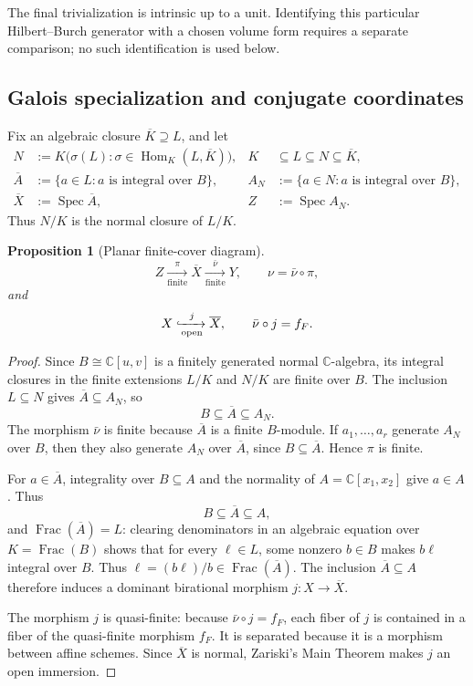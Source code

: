 \documentclass[11pt]{article}
\newtheorem{proposition}[theorem]{Proposition}
\theoremstyle{remark}
\theoremstyle{definition}
\DeclareMathOperator{\Spec}{Spec}
\DeclareMathOperator{\Frac}{Frac}
\DeclareMathOperator{\Hom}{Hom}
\newcommand{\C}{\mathbb C}
\begin{document}
The final trivialization is intrinsic up to a unit.  Identifying this
particular Hilbert--Burch generator with a chosen volume form requires a
separate comparison; no such identification is used below.

\subsection{Galois specialization and conjugate coordinates}

Fix an algebraic closure \(\overline K\supseteq L\), and let
\[
  \begin{aligned}
  N
    &:=
      K\bigl(\sigma(L):
        \sigma\in\Hom_K(L,\overline K)\bigr),
    &K&\subseteq L\subseteq N\subseteq\overline K,\\
  \overline A
    &:=
      \{a\in L:a\text{ is integral over }B\},
  &
  A_N
    &:=
      \{a\in N:a\text{ is integral over }B\},\\
  \overline X&:=\Spec\overline A,
  &
  Z&:=\Spec A_N.
  \end{aligned}
\]
Thus \(N/K\) is the normal closure of \(L/K\).

\begin{proposition}[Planar finite-cover diagram]
\label{prop:planar-normalization-diagram}
\[
  Z\xrightarrow[\mathrm{finite}]{\pi}
  \overline X\xrightarrow[\mathrm{finite}]{\bar\nu}Y,
  \qquad
  \nu=\bar\nu\circ\pi,
\]
and
\[
  X\xhookrightarrow[\mathrm{open}]{j}\overline X,
  \qquad
  \bar\nu\circ j=f_F.
\]
\end{proposition}

\begin{proof}
Since \(B\cong\C[u,v]\) is a finitely generated normal
\(\C\)-algebra, its integral closures in the finite extensions \(L/K\) and
\(N/K\) are finite over \(B\).  The inclusion \(L\subseteq N\) gives
\(\overline A\subseteq A_N\), so
\[
  B\subseteq\overline A\subseteq A_N.
\]
The morphism \(\bar\nu\) is finite because \(\overline A\) is a finite
\(B\)-module.  If \(a_1,\dots,a_r\) generate \(A_N\) over \(B\), then
they also generate \(A_N\) over \(\overline A\), since
\(B\subseteq\overline A\).  Hence \(\pi\) is finite.

For \(a\in\overline A\), integrality over \(B\subseteq A\) and the
normality of \(A=\C[x_1,x_2]\) give \(a\in A\).  Thus
  \[
  B\subseteq\overline A\subseteq A,
  \]
and \(\Frac(\overline A)=L\): clearing denominators in an algebraic
equation over \(K=\Frac(B)\) shows that for every \(\ell\in L\), some
nonzero \(b\in B\) makes \(b\ell\) integral over \(B\).  Thus
\(\ell=(b\ell)/b\in\Frac(\overline A)\).
The inclusion \(\overline A\subseteq A\) therefore induces a dominant
birational morphism \(j\colon X\to\overline X\).

The morphism \(j\) is quasi-finite: because
\(\bar\nu\circ j=f_F\), each fiber of \(j\) is contained in a fiber of
the quasi-finite morphism \(f_F\).  It is separated because it is a
morphism between affine schemes.  Since
\(\overline X\) is normal, Zariski's Main Theorem makes \(j\) an open
immersion.
\end{proof}
\end{document}
